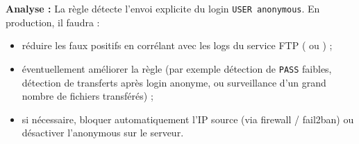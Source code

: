 \textbf{Analyse :}  
La règle détecte l’envoi explicite du login \texttt{USER anonymous}. En production, il faudra :
\begin{itemize}
  \item réduire les faux positifs en corrélant avec les logs du service FTP ( ou ) ;
  \item éventuellement améliorer la règle (par exemple détection de \texttt{PASS} faibles, détection de transferts après login anonyme, ou surveillance d'un grand nombre de fichiers transférés) ;
  \item si nécessaire, bloquer automatiquement l’IP source (via firewall / fail2ban) ou désactiver l’anonymous sur le serveur.
\end{itemize}